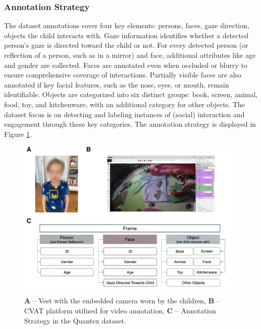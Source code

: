 \documentclass[
  man,floatsintext]{apa6}
\begin{document}
\subsubsection{Annotation Strategy}\label{annotation-strategy}

The dataset annotations cover four key elements: persons, faces, gaze direction, objects the child interacts with. Gaze information identifies whether a detected person's gaze is directed toward the child or not. For every detected person (or reflection of a person, such as in a mirror) and face, additional attributes like age and gender are collected. Faces are annotated even when occluded or blurry to ensure comprehensive coverage of interactions. Partially visible faces are also annotated if key facial features, such as the nose, eyes, or mouth, remain identifiable. Objects are categorized into six distinct groups: book, screen, animal, food, toy, and kitchenware, with an additional category for other objects. The dataset focus is on detecting and labeling instances of (social) interaction and engagement through these key categories. The annotation strategy is displayed in Figure \ref{fig:camera-cvat-activity-classes}.

\begin{figure}

{\centering \includegraphics{Quantex_interaction_paper_files/figure-latex/camera-cvat-activity-classes-1} 

}

\caption{\textbf{A} – Vest with the embedded camera worn by the children, \textbf{B} – CVAT platform utilized for video annotation, \textbf{C} – Annotation Strategy in the Quantex dataset.}\label{fig:camera-cvat-activity-classes}
\end{figure}
\end{document}

